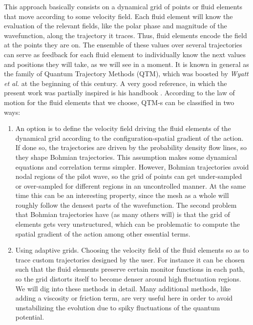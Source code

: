 \documentclass[11pt, a4paper]{article} %
\begin{document}
\begin{enumerate}
This approach basically consists on a dynamical grid of points or fluid elements that move according to some velocity field. Each fluid element will know the evaluation of the relevant fields, like the polar phase and magnitude of the wavefunction, along the trajectory it traces. Thus, fluid elements encode the field at the points they are on. The ensemble of these values over several trajectories can serve as feedback for each fluid element to individually know the next values and positions they will take, as we will see in a moment. It is known in general as the family of Quantum Trajectory Methods (QTM), which was boosted by {\em Wyatt et al.} at the beginning of this century. A very good reference, in which the present work was partially inspired is his handbook \cite{Wyatt}. According to the law of motion for the fluid elements that we choose, QTM-s can be classified in two ways:
\begin{enumerate}
\item An option is to define the velocity field driving the fluid elements of the dynamical grid according to the configuration-spatial gradient of the action. If done so, the trajectories are driven by the probability density flow lines, so they shape Bohmian trajectories. This assumption makes some dynamical equations and correlation terms simpler. However, Bohmian trajectories avoid nodal regions of the pilot wave, so the grid of points can get under-sampled or over-sampled for different regions in an uncontrolled manner. At the same time this can be an interesting property, since the mesh as a whole will roughly follow the densest parts of the wavefunction. The second problem that Bohmian trajectories have (as many others will) is that the grid of elements gets very unstructured, which can be problematic to compute the spatial gradient of the action among other essential terms.

\item Using adaptive grids. Choosing the velocity field of the fluid elements so as to trace custom trajectories designed by the user. For instance it can be chosen such that the fluid elements preserve certain monitor functions in each path, so the grid distorts itself to become denser around high fluctuation regions. We will dig into these methods in detail. Many additional methods, like adding a viscosity or friction term, are very useful here in order to avoid unstabilizing the evolution due to spiky fluctuations of the quantum potential.
\end{enumerate}


\end{enumerate}
\end{document}
